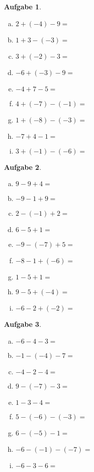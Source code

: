 \documentclass[12pt,fleqn]{article}
\theoremstyle{aufg}
\newtheorem{aufgabe}{Aufgabe}
\theoremstyle{bsp}
\begin{document}
\begin{flushleft}
\begin{aufgabe}
\begin{multicols}{3} 
\begin{enumerate}[a)] 
\item 
$2+(-4)-9=$
\item 
$1+3-(-3)=$
\item 
$3+(-2)-3=$
\item 
$-6+(-3)-9=$
\item 
$-4+7-5=$
\item 
$4+(-7)-(-1)=$
\item 
$1+(-8)-(-3)=$
\item 
$-7+4-1=$
\item 
$3+(-1)-(-6)=$
\end{enumerate} 
\end{multicols} 
\end{aufgabe} 
\begin{aufgabe} ~ \\ 
\begin{multicols}{3} 
\begin{enumerate}[a)] 
\item 
$9-9+4=$
\item 
$-9-1+9=$
\item 
$2-(-1)+2=$
\item 
$6-5+1=$
\item 
$-9-(-7)+5=$
\item 
$-8-1+(-6)=$
\item 
$1-5+1=$
\item 
$9-5+(-4)=$
\item 
$-6-2+(-2)=$
\end{enumerate} 
\end{multicols} 
\end{aufgabe} 
\begin{aufgabe} ~ \\ 
\begin{multicols}{3} 
\begin{enumerate}[a)] 
\item 
$-6-4-3=$
\item 
$-1-(-4)-7=$
\item 
$-4-2-4=$
\item 
$9-(-7)-3=$
\item 
$1-3-4=$
\item 
$5-(-6)-(-3)=$
\item 
$6-(-5)-1=$
\item 
$-6-(-1)-(-7)=$
\item 
$-6-3-6=$
\end{enumerate} 
\end{multicols} 
\end{aufgabe} 
\end{flushleft} 
\end{document}
